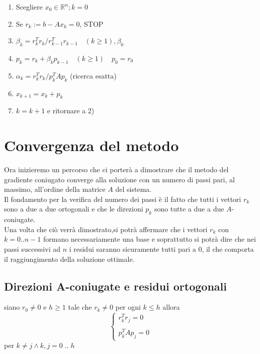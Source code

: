 \begin{enumerate}
 \item Scegliere $x_0 \in \mathbb{R}^{n}; k =0$
 \item Se $r_{k}:= b-A x_{k} = 0$, STOP
 \item $\beta_{k} = r_{k}^{T}r_{k} / r_{k-1}^{T}r_{k-1} \quad (k \geq
1), \beta_{0}$ \quad
 \item $p_{k} = r_{k} + \beta_{k} p_{k-1} \quad (k \geq 1) \quad
p_{0}=r_{0}$
 \item $\alpha_{k} = r_{k}^{T}r_{k}/p_{k}^{T} A p_{k}$ \quad (ricerca
esatta)
 \item $x_{k+1} = x_{k} + p_{k}$
 \item $k = k+1$ e ritornare a 2)
\end{enumerate}

\section{Convergenza del metodo}

Ora inizieremo un percorso che ci porterà a dimostrare che il metodo
del gradiente coniugato converge alla soluzione con un numero di passi
pari, al massimo, all'ordine della matrice $A$ del sistema.\\ Il
fondamento per la verifica del numero dei passi \`e il fatto che tutti i
vettori $r_{k}$ sono a due a due ortogonali e che le direzioni $p_{k}$
sono tutte a due a due $A$-coniugate.\\ Una volta che ciò verrà
dimostrato,si potrà affermare che i vettori $r_{k}$ con $k=0..n-1$
formano necessariamente una base e soprattutto si potrà dire che nei
passi successivi ad $n$ i residui saranno sicuramente tutti pari a 0,
il che comporta il raggiungimento della soluzione ottimale.

\subsection{Direzioni A-coniugate e residui ortogonali}
\begin{theo} siano $r_{0} \neq 0 $ e $h \geq 1$ tale che $r_{k} \neq
0$ per ogni $k \leq h$ allora
$$\left\{
\begin{array}{ll} r_{k}^{T} r_{j} = 0\\ \\ p_{k}^{T} A p_{j} = 0
\end{array} \right.
$$
per $k \neq j \wedge k,j=0\; ..\; h$
\end{theo}

